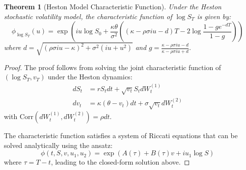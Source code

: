 \documentclass[12pt,a4paper]{article}
\newtheorem{theorem}{Theorem}[section]
\theoremstyle{definition}
\theoremstyle{remark}
\begin{document}
\begin{appendices}
\begin{theorem}[Heston Model Characteristic Function]
\label{thm:heston_characteristic}
Under the Heston stochastic volatility model, the characteristic function of $\log S_T$ is given by:
\begin{equation}
\phi_{\log S_T}(u) = \exp\left(iu\log S_0 + \frac{\kappa\theta}{\sigma^2}((\kappa - \rho\sigma iu - d)T - 2\log\frac{1-ge^{-dT}}{1-g})\right)
\end{equation}
where $d = \sqrt{(\rho\sigma iu - \kappa)^2 + \sigma^2(iu + u^2)}$ and $g = \frac{\kappa - \rho\sigma iu - d}{\kappa - \rho\sigma iu + d}$.
\end{theorem}

\begin{proof}
The proof follows from solving the joint characteristic function of $(\log S_T, v_T)$ under the Heston dynamics:
\begin{align}
dS_t &= rS_t dt + \sqrt{v_t}S_t dW_t^{(1)}\\
dv_t &= \kappa(\theta - v_t)dt + \sigma\sqrt{v_t}dW_t^{(2)}
\end{align}
with $\text{Corr}(dW_t^{(1)}, dW_t^{(2)}) = \rho dt$.

The characteristic function satisfies a system of Riccati equations that can be solved analytically using the ansatz:
\begin{equation}
\phi(t,S,v,u_1,u_2) = \exp(A(\tau) + B(\tau)v + iu_1\log S)
\end{equation}
where $\tau = T-t$, leading to the closed-form solution above.
\end{proof}

\end{appendices}
\end{document}

